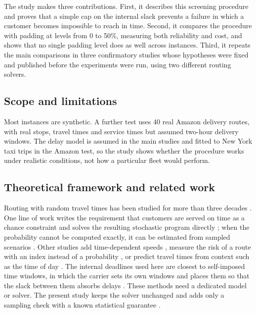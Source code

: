 \documentclass[12pt,letterpaper]{article}
\begin{document}
The study makes three contributions. First, it describes this screening procedure
and proves that a simple cap on the internal slack prevents a failure in which a
customer becomes impossible to reach in time. Second, it compares the procedure
with padding at levels from 0 to 50\%, measuring both reliability and cost, and
shows that no single padding level does as well across instances. Third, it
repeats the main comparisons in three confirmatory studies whose hypotheses were
fixed and published before the experiments were run, using two different routing
solvers.

\subsection{Scope and limitations}

Most instances are synthetic. A further test uses 40 real Amazon delivery routes,
with real stops, travel times and service times but assumed two-hour delivery
windows. The delay model is assumed in the main studies and fitted to New York taxi trips
in the Amazon test, so the study shows whether the procedure works under
realistic conditions, not how a particular fleet would perform.

\subsection{Theoretical framework and related work}

Routing with random travel times has been studied for more than three
decades \cite{laporte1992,gendreau1996,kenyon2003}. One line of work writes the
requirement that customers are served on time as a chance constraint and solves the
resulting stochastic program directly \cite{li2010,ehmke2015}; when the probability
cannot be computed exactly, it can be estimated from sampled
scenarios \cite{ahmed2008}. Other studies add time-dependent
speeds \cite{tas2014,bomboi2022}, measure the risk of a route with an index instead
of a probability \cite{jaillet2016,zhang2019}, or predict travel times from context
such as the time of day \cite{serrano2026}. The internal deadlines used here are
closest to self-imposed time windows, in which the carrier sets its own windows and
places them so that the slack between them absorbs delays \cite{jabali2015,vareias2019}.
These methods need a dedicated model or solver. The present study keeps the solver
unchanged and adds only a sampling check with a known statistical
guarantee \cite{wilson1927,brown2001}.
\end{document}
